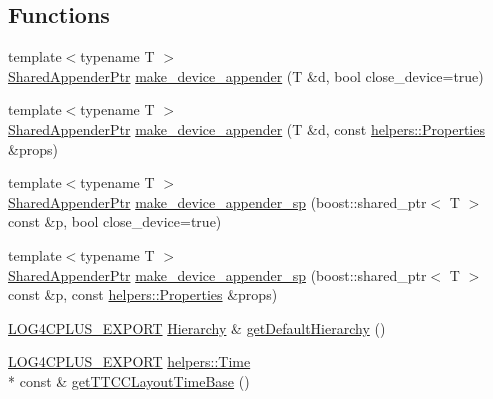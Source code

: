 \subsection*{Functions}
\begin{DoxyCompactItemize}
\item 
{\footnotesize template$<$typename T $>$ }\\\hyperlink{namespacelog4cplus_a12d841b842c72396be9219ce67a0c215}{Shared\-Appender\-Ptr} \hyperlink{namespacelog4cplus_a6cd69c9631199288a443246ca4b9eb41}{make\-\_\-device\-\_\-appender} (T \&d, bool close\-\_\-device=true)
\item 
{\footnotesize template$<$typename T $>$ }\\\hyperlink{namespacelog4cplus_a12d841b842c72396be9219ce67a0c215}{Shared\-Appender\-Ptr} \hyperlink{namespacelog4cplus_a0b5d98426d0aec0c3ae06da0fe06c56d}{make\-\_\-device\-\_\-appender} (T \&d, const \hyperlink{classlog4cplus_1_1helpers_1_1Properties}{helpers\-::\-Properties} \&props)
\item 
{\footnotesize template$<$typename T $>$ }\\\hyperlink{namespacelog4cplus_a12d841b842c72396be9219ce67a0c215}{Shared\-Appender\-Ptr} \hyperlink{namespacelog4cplus_a295c3bbd215e358620ea5daddc5b9a2c}{make\-\_\-device\-\_\-appender\-\_\-sp} (boost\-::shared\-\_\-ptr$<$ T $>$ const \&p, bool close\-\_\-device=true)
\item 
{\footnotesize template$<$typename T $>$ }\\\hyperlink{namespacelog4cplus_a12d841b842c72396be9219ce67a0c215}{Shared\-Appender\-Ptr} \hyperlink{namespacelog4cplus_abbba7b20a778bed78e5d48ec33cbbff2}{make\-\_\-device\-\_\-appender\-\_\-sp} (boost\-::shared\-\_\-ptr$<$ T $>$ const \&p, const \hyperlink{classlog4cplus_1_1helpers_1_1Properties}{helpers\-::\-Properties} \&props)
\item 
\hyperlink{config_8hxx_ab13cb1a5317c245ee2ef4f2bfe0cfb2d}{L\-O\-G4\-C\-P\-L\-U\-S\-\_\-\-E\-X\-P\-O\-R\-T} \hyperlink{classlog4cplus_1_1Hierarchy}{Hierarchy} \& \hyperlink{namespacelog4cplus_ad5d0f067edbcf8ffa7327d4c806cc115}{get\-Default\-Hierarchy} ()
\item 
\hyperlink{config_8hxx_ab13cb1a5317c245ee2ef4f2bfe0cfb2d}{L\-O\-G4\-C\-P\-L\-U\-S\-\_\-\-E\-X\-P\-O\-R\-T} \hyperlink{namespacelog4cplus_1_1helpers_af05d40c37e1cccf9d11d0cbb7426bcd4}{helpers\-::\-Time} \\*
const \& \hyperlink{namespacelog4cplus_a2136dabb9c5248235261edd0e6093922}{get\-T\-T\-C\-C\-Layout\-Time\-Base} ()
\item 

\end{DoxyCompactItemize}
